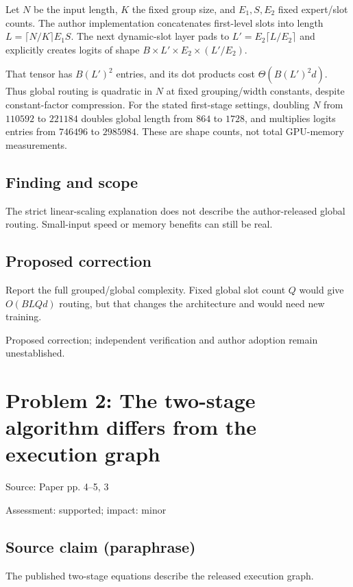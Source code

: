 \documentclass[11pt]{article}
\begin{document}
Let \(N\) be the input length, \(K\) the fixed group size, and \(E_1,S,E_2\) fixed expert/slot counts. The author implementation concatenates first-level slots into length \(L=\lceil N/K\rceil E_1S\). The next dynamic-slot layer pads to \(L'=E_2\lceil L/E_2\rceil\) and explicitly creates logits of shape \(B\times L'\times E_2\times(L'/E_2)\).

That tensor has \(B(L')^2\) entries, and its dot products cost \(\Theta(B(L')^2d)\). Thus global routing is quadratic in \(N\) at fixed grouping/width constants, despite constant-factor compression. For the stated first-stage settings, doubling \(N\) from \(110592\) to \(221184\) doubles global length from \(864\) to \(1728\), and multiplies logits entries from \(746496\) to \(2985984\). These are shape counts, not total GPU-memory measurements.

\subsection*{Finding and scope}

The strict linear-scaling explanation does not describe the author-released global routing. Small-input speed or memory benefits can still be real.

\subsection*{Proposed correction}

Report the full grouped/global complexity. Fixed global slot count \(Q\) would give \(O(BLQd)\) routing, but that changes the architecture and would need new training.

Proposed correction; independent verification and author adoption remain unestablished.

\section*{Problem 2: The two-stage algorithm differs from the execution graph}

Source: Paper pp. 4–5, 3

Assessment: supported; impact: minor

\subsection*{Source claim (paraphrase)}

The published two-stage equations describe the released execution graph.
\end{document}
